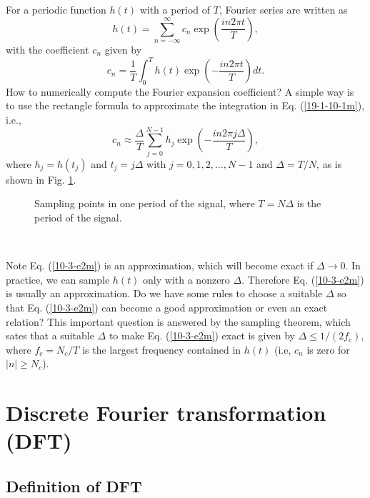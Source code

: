 \documentclass{article}
\begin{document}
For a periodic function $h (t)$ with a period of $T$, Fourier series are
written as
\begin{equation}
  h (t) = \sum_{n = - \infty}^{\infty} c_n \exp \left( \frac{i n 2 \pi t}{T}
  \right),
\end{equation}
with the coefficient $c_n$ given by
\begin{equation}
  \label{19-1-10-1m} c_n = \frac{1}{T} \int_0^T h (t) \exp \left( - \frac{i n
  2 \pi t}{T} \right) d t.
\end{equation}
How to numerically compute the Fourier expansion coefficient? A simple way is
to use the rectangle formula to approximate the integration in Eq.
(\ref{19-1-10-1m}), i.e.,
\begin{equation}
  \label{10-3-e2m} c_n \approx \frac{\Delta}{T} \sum_{j = 0}^{N - 1} h_j \exp
  \left( - \frac{i n 2 \pi j \Delta}{T} \right),
\end{equation}
where $h_j = h (t_j)$ and $t_j = j \Delta$ with $j = 0, 1, 2, \ldots, N - 1$
and $\Delta = T / N$, as is shown in Fig. \ref{16-2-25}.

\begin{figure}[h]
  \caption{\label{16-2-25}Sampling points in one period of the signal, where
  $T = N \Delta$ is the period of the signal.}
\end{figure}

\

Note Eq. (\ref{10-3-e2m}) is an approximation, which will become exact if
$\Delta \rightarrow 0$. In practice, we can sample $h (t)$ only with a nonzero
$\Delta$. Therefore Eq. (\ref{10-3-e2m}) is usually an approximation. Do we
have some rules to choose a suitable $\Delta$ so that Eq. (\ref{10-3-e2m}) can
become a good approximation or even an exact relation? This important question
is answered by the sampling theorem, which sates that a suitable $\Delta$ to
make Eq. (\ref{10-3-e2m}) exact is given by $\Delta \leqslant 1 / (2 f_c)$,
where $f_c = N_c / T$ is the largest frequency contained in $h (t)$ (i.e,
$c_n$ is zero for $| n | \geqslant N_c$).

\section{Discrete Fourier transformation (DFT)}\label{9-29-8}

\subsection{Definition of DFT}
\end{document}
